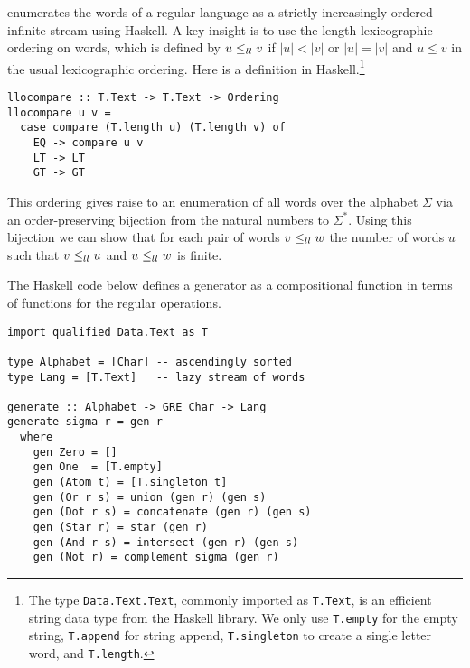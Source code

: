 \citet{DBLP:journals/jfp/McIlroy99} enumerates the words of a regular language as a
strictly increasingly ordered infinite stream using Haskell. A key insight is to use the
length-lexicographic ordering on words, which is defined by $u \le_{ll} v$ if $|u|<|v|$ or
$|u|=|v|$ and $u\le v$ in the usual lexicographic ordering. Here is a definition in Haskell.\footnote{The type
  \lstinline{Data.Text.Text}, commonly imported as \lstinline{T.Text}, is an efficient
  string data type from the Haskell library. We only use \lstinline{T.empty} for the empty
  string, \lstinline{T.append} for string append, \lstinline{T.singleton} to create a
  single letter word, and \lstinline{T.length}.}
\begin{lstlisting}
llocompare :: T.Text -> T.Text -> Ordering
llocompare u v =
  case compare (T.length u) (T.length v) of
    EQ -> compare u v
    LT -> LT
    GT -> GT
\end{lstlisting}
This ordering gives raise to an
enumeration of all words over the alphabet $\Sigma$ via an order-preserving
bijection from the natural numbers to $\Sigma^*$. Using this
bijection we can show that for each pair of words $v \le_{ll} w$ the
number of words $u$ such that $v \le_{ll} u$ and $u \le_{ll} w$ is finite. 


The Haskell code below defines a generator as a compositional function in terms of functions for
the regular operations. 
\begin{lstlisting}
import qualified Data.Text as T

type Alphabet = [Char] -- ascendingly sorted
type Lang = [T.Text]   -- lazy stream of words

generate :: Alphabet -> GRE Char -> Lang
generate sigma r = gen r
  where
    gen Zero = []
    gen One  = [T.empty]
    gen (Atom t) = [T.singleton t]
    gen (Or r s) = union (gen r) (gen s)
    gen (Dot r s) = concatenate (gen r) (gen s)
    gen (Star r) = star (gen r)
    gen (And r s) = intersect (gen r) (gen s)
    gen (Not r) = complement sigma (gen r)
\end{lstlisting}

